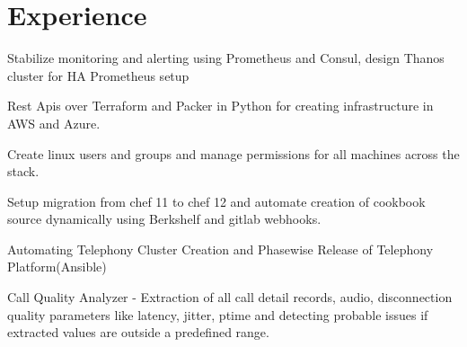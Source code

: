 \documentclass[]{deedy-resume-openfont}
\begin{document}
\hfill
\begin{minipage}[t]{0.66\textwidth}


\section{Experience}

\vspace{\topsep} %
\sectionsep

\vspace{\topsep} %
\begin{tightemize}
\item Stabilize monitoring and alerting using Prometheus and Consul, design Thanos cluster for HA Prometheus setup
\end{tightemize}
\sectionsep

\vspace{\topsep} %
\begin{tightemize}
\item Rest Apis over Terraform and Packer in Python for creating infrastructure in AWS and Azure.
\item Create linux users and groups and manage permissions for all machines across the stack.
\item Setup migration from chef 11 to chef 12 and automate creation of cookbook source dynamically using Berkshelf and gitlab webhooks.
\end{tightemize}
\sectionsep

\begin{tightemize}
\item Automating Telephony Cluster Creation and Phasewise Release of Telephony Platform(Ansible)
\end{tightemize}
\sectionsep

\begin{tightemize}
\item Call Quality Analyzer - Extraction of all call detail records, audio, disconnection quality parameters like latency, jitter, ptime and detecting probable issues if extracted values are outside a predefined range.
\end{tightemize}
\sectionsep


\end{minipage}
\end{document}
